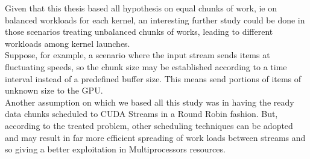  Given that this thesis based all hypothesis on equal chunks of work, ie on balanced workloads for each kernel, an interesting further study could be done in those scenarios treating unbalanced chunks of works, leading to different workloads among kernel launches.\\
 Suppose, for example, a scenario where the input stream sends items at fluctuating speeds, so the chunk size may be established according to a time interval instead of a predefined buffer size. This means send portions of items of unknown size to the GPU.\\
 
 Another assumption on which we based all this study was in having the ready data chunks scheduled to CUDA Streams in a Round Robin fashion. But, according to the treated problem, other scheduling techniques can be adopted and may result in far more efficient spreading of work loads between streams and so giving a better exploitation in Multiprocessors resources.
 